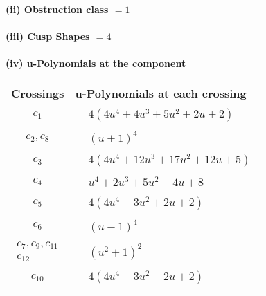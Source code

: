 \documentclass[1p]{elsarticle_modified}
\theoremstyle{definition}
\begin{document}
\flushleft \textbf{(ii) Obstruction class $= 1$}\\~\\
\flushleft \textbf{(iii) Cusp Shapes $= 4$}\\~\\
\newpage\renewcommand{\arraystretch}{1}
\flushleft \textbf{(iv) u-Polynomials at the component}\newline \\
\begin{tabular}{m{50pt}|m{274pt}}
Crossings & \hspace{64pt}u-Polynomials at each crossing \\
\hline $$\begin{aligned}c_{1}\end{aligned}$$&$\begin{aligned}
&4(4 u^4+4 u^3+5 u^2+2 u+2)
\end{aligned}$\\
\hline $$\begin{aligned}c_{2},c_{8}\end{aligned}$$&$\begin{aligned}
&(u+1)^4
\end{aligned}$\\
\hline $$\begin{aligned}c_{3}\end{aligned}$$&$\begin{aligned}
&4(4 u^4+12 u^3+17 u^2+12 u+5)
\end{aligned}$\\
\hline $$\begin{aligned}c_{4}\end{aligned}$$&$\begin{aligned}
&u^4+2 u^3+5 u^2+4 u+8
\end{aligned}$\\
\hline $$\begin{aligned}c_{5}\end{aligned}$$&$\begin{aligned}
&4(4 u^4-3 u^2+2 u+2)
\end{aligned}$\\
\hline $$\begin{aligned}c_{6}\end{aligned}$$&$\begin{aligned}
&(u-1)^4
\end{aligned}$\\
\hline $$\begin{aligned}c_{7},c_{9},c_{11}\\c_{12}\end{aligned}$$&$\begin{aligned}
&(u^2+1)^2
\end{aligned}$\\
\hline $$\begin{aligned}c_{10}\end{aligned}$$&$\begin{aligned}
&4(4 u^4-3 u^2-2 u+2)
\end{aligned}$\\
\hline
\end{tabular}\\~\\
\end{document}

